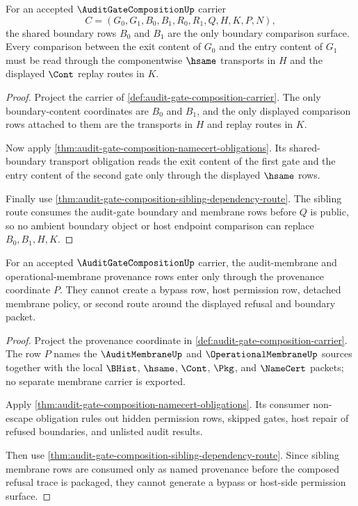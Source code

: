 \begin{theorem}
\label{thm:audit-gate-composition-boundary-obligation}
For an accepted $\AuditGateCompositionUp$ carrier
$$
C=(G_0,G_1,B_0,B_1,R_0,R_1,Q,H,K,P,N),
$$
the shared boundary rows $B_0$ and $B_1$ are the only boundary comparison surface. Every comparison between the exit content of $G_0$ and the entry content of $G_1$ must be read through the componentwise $\hsame$ transports in $H$ and the displayed $\Cont$ replay routes in $K$.
\end{theorem}
\begin{proof}
Project the carrier of \autoref{def:audit-gate-composition-carrier}. The only boundary-content coordinates are $B_0$ and $B_1$, and the only displayed comparison rows attached to them are the transports in $H$ and replay routes in $K$.

Now apply \autoref{thm:audit-gate-composition-namecert-obligations}. Its shared-boundary transport obligation reads the exit content of the first gate and the entry content of the second gate only through the displayed $\hsame$ rows.

Finally use \autoref{thm:audit-gate-composition-sibling-dependency-route}. The sibling route consumes the audit-gate boundary and membrane rows before $Q$ is public, so no ambient boundary object or host endpoint comparison can replace $B_0,B_1,H,K$.
\end{proof}

\begin{theorem}
\label{thm:audit-gate-composition-membrane-obligation}
For an accepted $\AuditGateCompositionUp$ carrier, the audit-membrane and operational-membrane provenance rows enter only through the provenance coordinate $P$. They cannot create a bypass row, host permission row, detached membrane policy, or second route around the displayed refusal and boundary packet.
\end{theorem}
\begin{proof}
Project the provenance coordinate in \autoref{def:audit-gate-composition-carrier}. The row $P$ names the $\AuditMembraneUp$ and $\OperationalMembraneUp$ sources together with the local $\BHist$, $\hsame$, $\Cont$, $\Pkg$, and $\NameCert$ packets; no separate membrane carrier is exported.

Apply \autoref{thm:audit-gate-composition-namecert-obligations}. Its consumer non-escape obligation rules out hidden permission rows, skipped gates, host repair of refused boundaries, and unlisted audit results.

Then use \autoref{thm:audit-gate-composition-sibling-dependency-route}. Since sibling membrane rows are consumed only as named provenance before the composed refusal trace is packaged, they cannot generate a bypass or host-side permission surface.
\end{proof}

